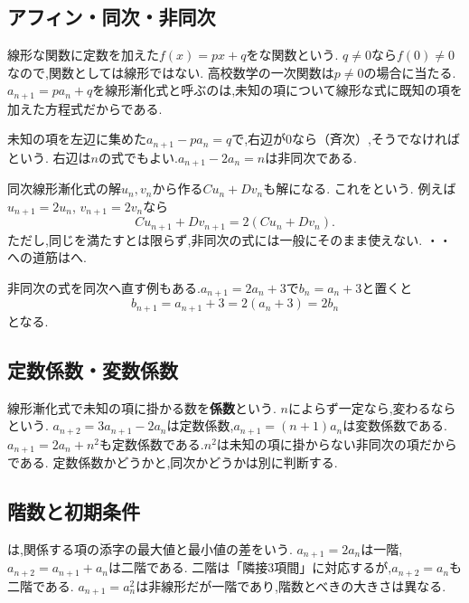   \subsection{アフィン・同次・非同次}\label{節：アフィン・同次・非同次}
    線形な関数に定数を加えた$f(x)=px+q$を\textbf{}な関数という.
    $q\ne0$なら$f(0)\ne0$なので,関数としては線形ではない.
    高校数学の一次関数は$p\ne0$の場合に当たる.
    $a_{n+1}=pa_n+q$を線形漸化式と呼ぶのは,未知の項について線形な式に既知の項を加えた方程式だからである.

    未知の項を左辺に集めた$a_{n+1}-pa_n=q$で,右辺が$0$なら\textbf{}（斉次）,そうでなければ\textbf{}という.
    右辺は$n$の式でもよい.$a_{n+1}-2a_n=n$は非同次である.

    同次線形漸化式の解$u_n,v_n$から作る$Cu_n+Dv_n$も解になる.
    これを\textbf{}という.
    例えば$u_{n+1}=2u_n$, $v_{n+1}=2v_n$なら
    \[
      Cu_{n+1}+Dv_{n+1}=2(Cu_n+Dv_n).
    \]
    ただし,同じを満たすとは限らず,非同次の式には一般にそのまま使えない.
    ・・への道筋はへ.

    非同次の式を同次へ直す例もある.$a_{n+1}=2a_n+3$で$b_n=a_n+3$と置くと
    \[
      b_{n+1}=a_{n+1}+3=2(a_n+3)=2b_n
    \]
    となる.

  \subsection{定数係数・変数係数}\label{節：定数係数・変数係数}
    線形漸化式で未知の項に掛かる数を\textbf{係数}という.
    $n$によらず一定なら\textbf{},変わるなら\textbf{}という.
    $a_{n+2}=3a_{n+1}-2a_n$は定数係数,$a_{n+1}=(n+1)a_n$は変数係数である.
    $a_{n+1}=2a_n+n^2$も定数係数である.$n^2$は未知の項に掛からない非同次の項だからである.
    定数係数かどうかと,同次かどうかは別に判断する.

  \subsection{階数と初期条件}\label{節：階数と初期条件}
    \textbf{}は,関係する項の添字の最大値と最小値の差をいう.
    $a_{n+1}=2a_n$は一階,$a_{n+2}=a_{n+1}+a_n$は二階である.
    二階は「隣接3項間」に対応するが,$a_{n+2}=a_n$も二階である.
    $a_{n+1}=a_n^2$は非線形だが一階であり,階数とべきの大きさは異なる.

